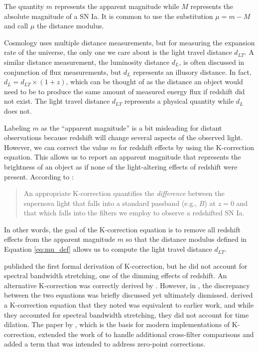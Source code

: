 \noindent The quantity $m$ represents the apparent magnitude while $M$
represents the absolute magnitude of a SN Ia. It is common to use the
substitution $\mu = m - M$ and call $\mu$ the distance modulus.

Cosmology uses multiple distance measurements, but for measuring the expansion
rate of the universe, the only one we care about is the light travel distance
$d_{LT}$. A similar distance measurement, the luminosity distance $d_L$, is
often discussed in conjunction of flux measurements, but $d_L$ represents an
illusory distance. In fact, ${d_{L} = d_{LT} \times (1 + z)}$, which can be
thought of as the distance an object would need to be to produce the same
amount of measured energy flux if redshift did not exist. The light travel
distance $d_{LT}$ represents a physical quantity while $d_{L}$ does not.

Labeling $m$ as the ``apparent magnitude'' is a bit misleading for distant
observations because redshift will change several aspects of the observed
light. However, we can correct the value $m$ for redshift effects by using the
K-correction equation. This allows us to report an apparent magnitude that
represents the brightness of an object as if none of the light-altering effects
of redshift were present. According to \citet{riess1998}:

\begin{quote}
  An appropriate K-correction quantifies the \emph{difference} between the supernova
  light that falls into a standard passband (e.g., $B$) at ${z = 0}$ and that
  which falls into the filters we employ to observe a redshifted SN Ia.
\end{quote}

\noindent In other words, the goal of the K-correction equation is to remove
all redshift effects from the apparent magnitude $m$ so that the distance
modulus defined in Equation \ref{eq:mu_def} allows us to compute the light
travel distance $d_{LT}$.

\citet{tolman1930} published the first formal derivation of K-correction, but
he did not account for spectral bandwidth stretching, one of the dimming
effects of redshift. An alternative K-correction was correctly derived by
\citet{desitter1934}. However, in \citet{hubble1935}, the discrepancy between
the two equations was briefly discussed yet ultimately dismissed.
\citet{oke1968} derived a K-correction equation that they noted was equivalent
to earlier work, and while they accounted for spectral bandwidth stretching,
they did not account for time dilation. The paper by \citet{kim1996}, which is
the basis for modern implementations of K-correction, extended the work of
\citet{oke1968} to handle additional cross-filter comparisons and added a term
that was intended to address zero-point corrections.

